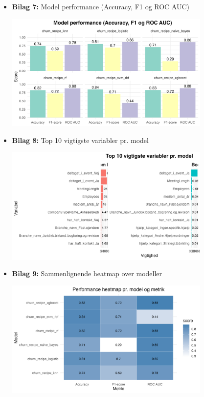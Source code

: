 \documentclass[
  11pt,
  letterpaper,
  DIV=11,
  numbers=noendperiod]{scrartcl}
\begin{document}
\begin{itemize}
\item
  \textbf{Bilag 7:} Model performance (Accuracy, F1 og ROC AUC)\\
  \begin{center}
  \includegraphics[width=0.8\textwidth,height=\textheight]{images/1_model_performance.png}
  \end{center}
\item
  \textbf{Bilag 8:} Top 10 vigtigste variabler pr. model\\
  \begin{center}
  \includegraphics[width=0.8\textwidth,height=\textheight]{images/4_top_10_variabler_pr_model.png}
  \end{center}
\item
  \textbf{Bilag 9:} Sammenlignende heatmap over modeller \begin{center}
  \includegraphics[width=0.8\textwidth,height=\textheight]{images/3_heatmap_pr_model.png}

\end{center}
\end{itemize}
\end{document}
